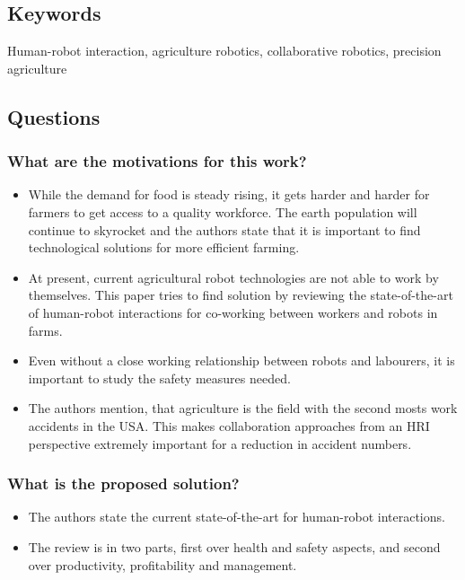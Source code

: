 \documentclass{article}
\begin{document}
\subsection*{Keywords}
Human-robot interaction, agriculture robotics, collaborative robotics, precision agriculture


\subsection*{Questions}
\subsubsection*{What are the motivations for this work?}
\begin{itemize}
    \item While the demand for food is steady rising, it gets harder and harder for farmers to get access to a quality workforce. The earth population will continue to skyrocket and the authors state that it is important to find technological solutions for more efficient farming.
    \item At present, current agricultural robot technologies are not able to work by themselves. This paper tries to find solution by reviewing the state-of-the-art of human-robot interactions for co-working between workers and robots in farms.
    \item Even without a close working relationship between robots and labourers, it is important to study the safety measures needed. 
    \item The authors mention, that agriculture is the field with the second mosts work accidents in the USA. This makes collaboration approaches from an HRI perspective extremely important for a reduction in accident numbers.
\end{itemize}
\subsubsection*{What is the proposed solution?}
\begin{itemize}
    \item The authors state the current state-of-the-art for human-robot interactions.
    \item The review is in two parts, first over health and safety aspects, and second over productivity, profitability and management.
\end{itemize}
\end{document}
